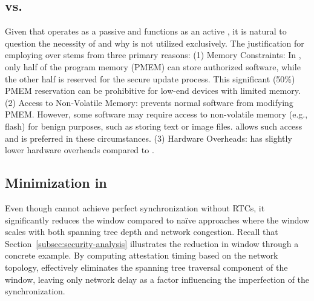 \subsection{\rata vs. \casu} \label{subsec:rata-casu-comparison}
%
Given that \rata operates as a passive \rot and \casu functions as an active \rot, 
it is natural to question the necessity of \rata and why \casu is not utilized exclusively.
The justification for employing \rata over \casu stems from three primary reasons:
(1) Memory Constraints: In \casu, only half of the program memory (PMEM) can store authorized software, while the other half is reserved for the secure update process. This significant (50\%) PMEM reservation can be prohibitive for low-end devices with limited memory. 
(2) Access to Non-Volatile Memory: \casu prevents normal software from modifying PMEM. However, some software may require access to non-volatile memory (e.g., flash) for benign purposes, such as storing text or image files. \rata allows such access and is preferred in these circumstances.
(3) Hardware Overheads: \rata has slightly lower hardware overheads compared to \casu. 

\subsection{\toctousa Minimization in \trapsnortc }\label{dis:precise_sync}
%
Even though \trapsnortc cannot achieve perfect synchronization without RTCs, it significantly 
reduces the \toctousa window compared to na\"ive approaches where the window scales with both 
spanning tree depth and network congestion. Recall that Section~\ref{subsec:security-analysis} illustrates the reduction in \toctousa window through a concrete example. By computing attestation timing based on the 
network topology, \trapsnortc effectively eliminates the spanning tree traversal component 
of the \toctousa window, leaving only network delay as a factor influencing the
imperfection of the synchronization. 
